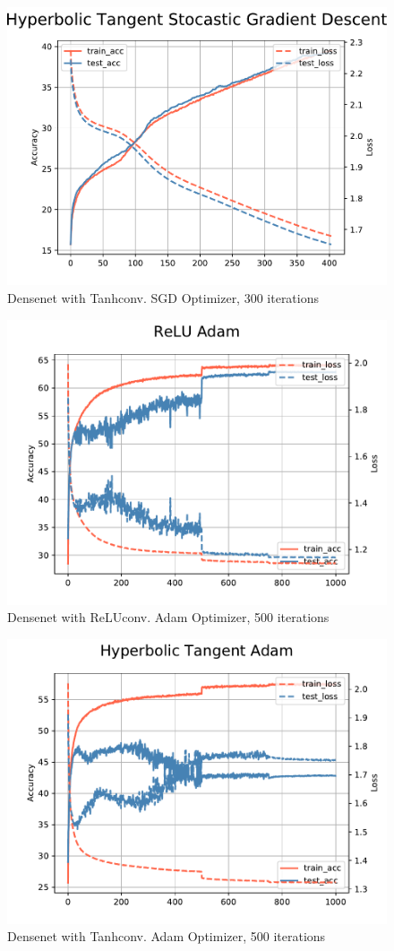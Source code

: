 \documentclass{article}
\begin{document}
\begin{figure}
        \centering
        \includegraphics[width=0.8\linewidth]{figures/SGD3k/tanh.pdf}
        \caption{Densenet with Tanhconv. SGD Optimizer, 300 iterations}
\end{figure}

\begin{figure}
        \centering
        \includegraphics[width=0.8\linewidth]{figures/Adam500/relu.pdf}
        \caption{Densenet with ReLUconv. Adam Optimizer, 500 iterations}
\end{figure}

\begin{figure}
        \centering
        \includegraphics[width=0.8\linewidth]{figures/Adam500/tanh.pdf}
        \caption{Densenet with Tanhconv. Adam Optimizer, 500 iterations}
\end{figure}
\end{document}
